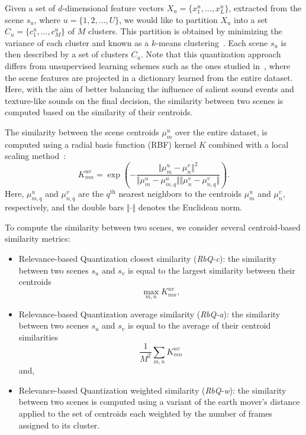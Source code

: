 \documentclass[smallextended]{svjour3}
\begin{document}
Given a set of $d$-dimensional feature vectors $X_u = \{x_1^u, \ldots, x_L^u\}$, extracted from the scene $s_u$, where $u=\lbrace 1,2,\ldots,U\rbrace$, we would like to partition $X_u$ into a set $C_u = \{c^u_1, \ldots, c^u_M\}$ of $M$ clusters. This partition is obtained by minimizing the variance of each cluster and known as a $k$-means clustering~\cite{lloyd}.
Each scene $s_u$ is then described by a set of clusters $C_u$. Note that this quantization approach differs from unsupervised learning schemes such as the ones studied in~\cite{bisot2016acoustic}, where the scene features are projected in a dictionary learned from the entire dataset. Here, with the aim of better balancing the influence of salient sound events and texture-like sounds on the final decision, the similarity between two scenes is computed based on the similarity of their centroids.

The similarity between the scene centroids $\mu_m^u$ over the entire dataset, is computed using a radial basis function (RBF) kernel $K$ combined with a local scaling method~\cite{selfTuneManor2004}:
\begin{equation}
\label{eq:kc}
K_{mn}^{uv} = \exp\left( - \dfrac{\Vert \mu_m^u - \mu_n^v \Vert^2}{\Vert \mu_m^u - \mu_{m,q}^u \Vert \Vert \mu_n^v - \mu_{n,q}^v \Vert} \right).
\end{equation}
Here, $\mu_{m,q}^u$ and $\mu_{n,q}^v$ are the $q^{\textrm{th}}$ nearest neighbors to the centroids $\mu_m^u$ and $\mu_n^v$, respectively, and the double bars $\Vert \cdot \Vert$ denotes the Euclidean norm.

To compute the similarity between two scenes, we consider several centroid-based similarity metrics:
\begin{itemize}
\item Relevance-based Quantization closest similarity (\emph{RbQ-c}): the similarity between two scenes $s_u$ and $s_v$ is equal to the largest similarity between their centroids
\begin{equation}
	\max_{m,n} K_{mn}^{uv},
\end{equation}
\item Relevance-based Quantization average similarity  (\emph{RbQ-a}): the similarity between two scenes $s_u$ and $s_v$ is equal to the average of their centroid similarities
\begin{equation}
	\frac{1}{M^2} \sum_{m,n} K_{mn}^{uv}
\end{equation}
and,
\item Relevance-based Quantization weighted similarity  (\emph{RbQ-w}): the similarity between two scenes is computed using a variant of the earth mover's distance applied to the set of centroids each weighted by the number of frames assigned to its cluster.
\end{itemize}
\end{document}

